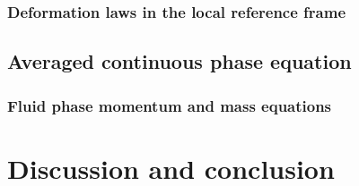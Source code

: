 \documentclass[12pt,a4paper,openany]{My_book}
\begin{document}
\subsubsection{Deformation laws in the local reference frame}

\subsection{Averaged continuous phase equation}

\subsubsection{Fluid phase momentum and mass equations}





\section{Discussion and conclusion}






% 
% 
% 
% 
% 
% 
% 

% 
% 
% 
\end{document}
